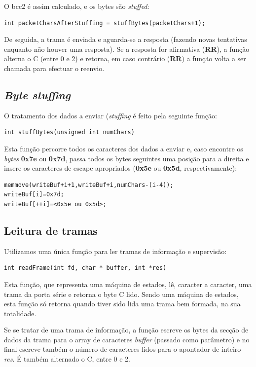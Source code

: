 \documentclass[a4paper,11pt]{article}
\begin{document}
O bcc2 é assim calculado, e os bytes são \textit{stuffed}:
\begin{lstlisting}
int packetCharsAfterStuffing = stuffBytes(packetChars+1);
\end{lstlisting}
De seguida, a trama é enviada e aguarda-se a resposta (fazendo novas tentativas enquanto não houver uma resposta).
Se a resposta for afirmativa (\textbf{RR}), a função alterna o C (entre 0 e 2) e retorna, em caso contrário (\textbf{RR}) a função volta a ser chamada para efectuar o reenvio.

\subsection{\textit{Byte stuffing}}
O tratamento dos dados a enviar (\textit{stuffing} é feito pela seguinte função:
\begin{lstlisting}
int stuffBytes(unsigned int numChars)
\end{lstlisting}
Esta função percorre todos os caracteres dos dados a enviar e, caso encontre os \textit{bytes} \textbf{0x7e} ou \textbf{0x7d}, passa todos os bytes seguintes uma posição para a direita e insere os caracteres de escape apropriados (\textbf{0x5e} ou \textbf{0x5d}, respectivamente):
\begin{lstlisting}
memmove(writeBuf+i+1,writeBuf+i,numChars-(i-4));
writeBuf[i]=0x7d;
writeBuf[++i]=<0x5e ou 0x5d>;
\end{lstlisting}

\subsection{Leitura de tramas}

Utilizamos uma única função para ler tramas de informação e supervisão:

\begin{lstlisting}
int readFrame(int fd, char * buffer, int *res)
\end{lstlisting}

Esta função, que representa uma máquina de estados, lê, caracter a caracter, uma trama da porta série e retorna o byte C lido. Sendo uma máquina de estados, esta função só retorna quando tiver sido lida uma trama bem formada, na sua totalidade.

Se se tratar de uma trama de informação, a função escreve os bytes da secção de dados da trama para o array de caracteres \textit{buffer} (passado como parâmetro) e no final escreve também o número de caracteres lidos para o apontador de inteiro \textit{res}. É também alternado o C, entre 0 e 2.
\end{document}
